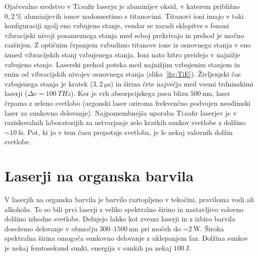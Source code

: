 Ojačevalno sredstvo v Ti:safir laserju je aluminijev oksid, v katerem 
približno $0,2~\%$ aluminijevih ionov nadomestimo s titanovimi. Titanovi ioni imajo 
v taki konfiguraciji zgolj eno vzbujeno stanje, vendar se zaradi sklopitve s fononi
vibracijski nivoji posameznega stanja med seboj prekrivajo in prehod je močno razširjen. 
Z optičnim črpanjem vzbudimo titanove ione iz osnovnega stanja v eno izmed vibracijskih 
stanj vzbujenega stanja. Ioni nato hitro preidejo v najnižje vzbujeno stanje. 
Laserski prehod poteka med najnižjim vzbujenim stanjem in enim od vibracijskih 
nivojev osnovnega stanja (slika~\ref{fig:TiE}). Življenjski čas
vzbujenega stanja je kratek ($3,2~\si{\micro\second}$) in širina črte največja med
vsemi trdninskimi laserji ($\Delta \nu =  100~\si{THz}$). 
Ker je vrh absorpcijskega pasu blizu $500~\si{\nano\metre}$,
laser črpamo z zeleno svetlobo (argonski laser oziroma
frekvenčno podvojen neodimski laser za sunkovno delovanje). 
Najpomembnejša uporaba Ti:safir laserjev je v raziskovalnih laboratorijih za ustvarjanje zelo 
kratkih sunkov svetlobe z dolžino $\sim 10~\si{\femto\second}$. Pot, ki jo 
v tem času prepotuje svetloba, je le nekaj valovnih dolžin svetlobe. 

\section{Laserji na organska barvila}
V laserjih na organska barvila je barvilo raztopljeno v tekočini, praviloma vodi ali alkoholu. 
To so bili prvi laserji z veliko spektralno širino in nastavljivo valovno dolžino
izhodne svetlobe. Delujejo lahko kot zvezni laserji in z izbiro barvila dosežemo
delovanje v območju $300$--$1500~\si{\nano\metre}$ pri močeh do $\sim 2~\si{\watt}$.
Široka spektralna širina omogoča sunkovno delovanje z uklepanjem faz. Dolžina sunkov je nekaj 
femtosekund sunki, energija v sunkih pa nekaj $100~\si{\joule}$.

